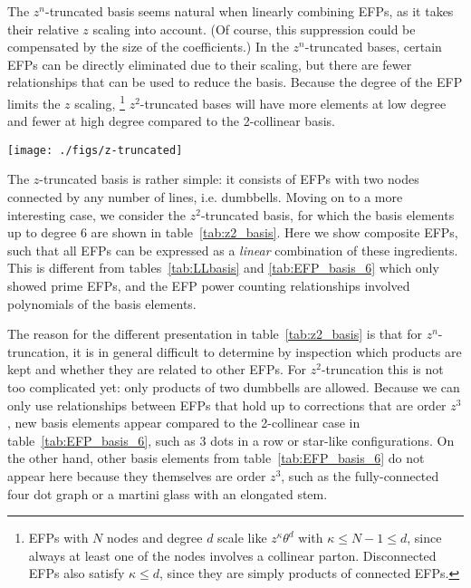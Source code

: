 \documentclass[a4paper,11pt]{article}
\newcommand{\tab}[1]{table~\ref{tab:#1}}
\newcommand{\tabs}[2]{tables~\ref{tab:#1} and \ref{tab:#2}}
\begin{document}
The $z^n$-truncated basis seems natural when linearly combining EFPs, as it takes their relative $z$ scaling into account.
%
(Of course, this suppression could be compensated by the size of the coefficients.)
%
In the $z^n$-truncated bases, certain EFPs can be directly eliminated due to their scaling, but there are fewer relationships that can be used to reduce the basis.
%
Because the degree of the EFP limits the $z$ scaling,%
%
\footnote{EFPs with $N$ nodes and degree $d$ scale like $z^\kappa \theta^{d}$ with $\kappa \leq N-1 \leq d$, since always at least one of the nodes involves a collinear parton. Disconnected EFPs also satisfy $\kappa \leq d$, since they are simply products of connected EFPs.}
%
$z^2$-truncated bases will have more elements at low degree and fewer at high degree compared to the 2-collinear basis. 

        \begin{table}[t]\centering
      \texttt{[image: ./figs/z-truncated]}  
      \caption{
      The $z^2$-truncated basis of EFPs up to degree 6. A generic EFP up to degree 6 can be expressed as a \emph{linear} combination in terms of these bases elements.  \label{tab:z2_basis} }
     \end{table}


The $z$-truncated basis is rather simple: it consists of EFPs with two nodes connected by any number of lines, i.e. dumbbells.
%
Moving on to a more interesting case, we consider the $z^2$-truncated basis, for which the basis elements up to degree 6 are shown in \tab{z2_basis}.
%
Here we show composite EFPs, such that all EFPs can be expressed as a \emph{linear} combination of these ingredients.
%
This is different from \tabs{LLbasis}{EFP_basis_6} which only showed prime EFPs, and the EFP power counting relationships involved polynomials of the basis elements.


The reason for the different presentation in \tab{z2_basis} is that for $z^n$-truncation, it is in general difficult to determine by inspection which products are kept and whether they are related to other EFPs.
%
For $z^2$-truncation this is not too complicated yet: only products of two dumbbells are allowed. 
%
Because we can only use relationships between EFPs that hold up to corrections that are order $z^3$, new basis elements appear compared to the 2-collinear case in \tab{EFP_basis_6}, such as 3 dots in a row or star-like configurations.
%
On the other hand, other basis elements from \tab{EFP_basis_6} do not appear here because they themselves are order $z^3$, such as the fully-connected four dot graph or a martini glass with an elongated stem.
\end{document}
